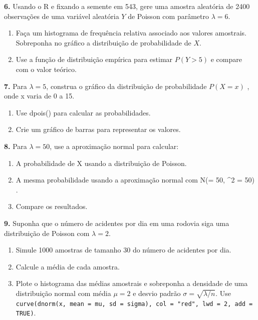 \documentclass[
]{book}
\begin{document}
\textbf{6.} Usando o R e fixando a semente em 543, gere uma amostra aleatória
de 2400 observações de uma variável aleatória \(Y\) de Poisson com
parâmetro \(\lambda = 6\).

\begin{enumerate}
\def\labelenumi{(\alph{enumi})}
\item
  Faça um histograma de frequência relativa associado aos valores
  amostrais. Sobreponha no gráfico a distribuição de probabilidade de \(X\).
\item
  Use a função de distribuição empírica para estimar \(P(Y > 5)\) e
  compare com o valor teórico.
\end{enumerate}

\textbf{7.} Para \(\lambda = 5\), construa o gráfico da distribuição de probabilidade \(P(X = x)\) , onde x varia de 0 a 15.

\begin{enumerate}
\def\labelenumi{(\alph{enumi})}
\item
  Use dpois() para calcular as probabilidades.
\item
  Crie um gráfico de barras para representar os valores.
\end{enumerate}

\textbf{8.} Para \(\lambda = 50\), use a aproximação normal para calcular:

\begin{enumerate}
\def\labelenumi{(\alph{enumi})}
\item
  A probabilidade de X  usando a distribuição de Poisson.
\item
  A mesma probabilidade usando a aproximação normal com N(\mu = 50, \sigma\^{}2 = 50) .
\item
  Compare os resultados.
\end{enumerate}

\textbf{9.} Suponha que o número de acidentes por dia em uma rodovia siga uma distribuição de Poisson com \(\lambda = 2\).

\begin{enumerate}
\def\labelenumi{(\alph{enumi})}
\item
  Simule 1000 amostras de tamanho 30 do número de acidentes por dia.
\item
  Calcule a média de cada amostra.
\item
  Plote o histograma das médias amostrais e sobreponha a densidade de uma distribuição normal com média \(\mu = 2\) e desvio padrão \(\sigma = \sqrt{\lambda / n}\). Use \texttt{curve(dnorm(x,\ mean\ =\ mu,\ sd\ =\ sigma),\ col\ =\ "red",\ lwd\ =\ 2,\ add\ =\ TRUE)}.
\end{enumerate}
\end{document}
